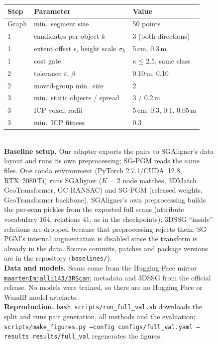 \documentclass[11pt, a4paper]{article}
\begin{document}
\begin{figure}[h]
\begin{minipage}{0.51\linewidth}
\begin{tabular}{@{}lll@{}}
\toprule
Step & Parameter & Value \\
\midrule
Graph & min.\ segment size & 50 points \\
1 & candidates per object $k$ & 3 (both directions) \\
1 & extent offset $\epsilon$, height scale $\sigma_h$ & 5\,cm, 0.3\,m \\
1 & cost gate & $\kappa\le2.5$, same class \\
2 & tolerance $\varepsilon$, $\beta$ & 0.10\,m, 0.10 \\
2 & moved-group min.\ size & 2 \\
3 & min.\ static objects / spread & 3 / 0.2\,m \\
3 & ICP voxel, radii & 5\,cm; 0.3, 0.1, 0.05\,m \\
3 & min.\ ICP fitness & 0.3 \\
\bottomrule
\end{tabular}\\[0.8em]
\textbf{Baseline setup.} Our adapter exports the pairs to SGAligner's data layout and runs its own preprocessing;
SG-PGM reads the same files. One conda environment (PyTorch 2.7.1/CUDA~12.8, RTX~2080\,Ti) runs SGAligner ($K=2$ node
matches, 3DMatch GeoTransformer, GC-RANSAC) and SG-PGM (released weights, GeoTransformer backbone). SGAligner's own
preprocessing builds the per-scan pickles from the exported full scans (attribute vocabulary 164, relations 41, as in
the checkpoints); 3DSSG ``inside'' relations are dropped because that preprocessing rejects them. SG-PGM's internal
augmentation is disabled since the transform is already in the data. Source commits, patches and package versions are
in the repository (\texttt{baselines/}).\\[0.5em]
\textbf{Data and models.} Scans come from the Hugging Face mirror
\href{https://huggingface.co/datasets/maartenImjalli143/3RScan}{\texttt{maartenImjalli143/3RScan}}; metadata and 3DSSG
from the official release. No models were trained, so there are no Hugging Face or WandB model artefacts.\\[0.5em]
\textbf{Reproduction.} \texttt{bash scripts/run\_full\_val.sh} downloads the split and runs pair generation, all
methods and the evaluation; \texttt{scripts/make\_figures.py --config configs/full\_val.yaml --results
results/full\_val} regenerates the figures.
\end{minipage}
\end{figure}
\end{document}
